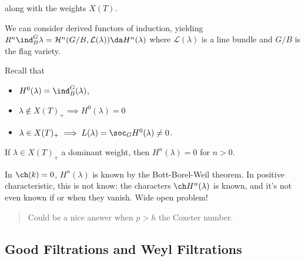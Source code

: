\begin{center}
\end{center}

along with the weights \(X(T)\).

We can consider derived functors of induction, yielding
\(R^n \ind_B^G \lambda = \mathcal{H}^n(G/B, \mathcal{L}(\lambda)) \da H^n(\lambda)\)
where \(\mathcal{L}(\lambda)\) is a line bundle and \(G/B\) is the flag
variety.

Recall that

\begin{itemize}
\tightlist
\item
  \(H^0(\lambda) = \ind_B^G(\lambda)\),
\item
  \(\lambda \not\in X(T)_+ \implies H^0(\lambda) = 0\)
\item
  \(\lambda \in X(T)_+ \implies L(\lambda) = \soc_G H^0(\lambda) \neq 0\).
\end{itemize}

\begin{theorem}[Kempf]

If \(\lambda \in X(T)_+\) a dominant weight, then \(H^n(\lambda) = 0\)
for \(n> 0\).

\end{theorem}

\begin{remark}

In \(\ch(k) = 0\), \(H^n(\lambda)\) is known by the Bott-Borel-Weil
theorem. In positive characteristic, this is not know: the characters
\(\ch H^n (\lambda)\) is known, and it's not even known if or when they
vanish. Wide open problem!

\begin{quote}
Could be a nice answer when \(p>h\) the Coxeter number.
\end{quote}

\end{remark}

\hypertarget{good-filtrations-and-weyl-filtrations}{%
\subsection{Good Filtrations and Weyl
Filtrations}\label{good-filtrations-and-weyl-filtrations}}

